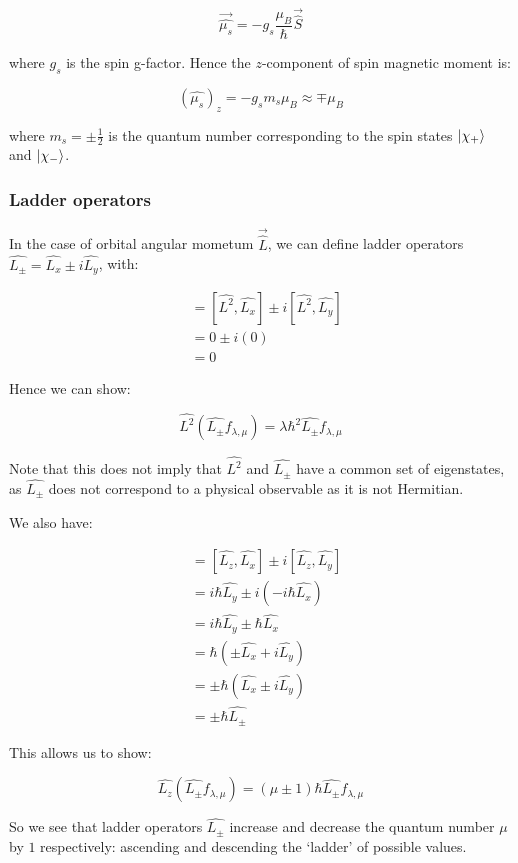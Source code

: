 \[ \vec{\hat{\mu_s}} = -g_s \frac{\mu_B}{\hbar} \vec{\hat{S}} \]

where $g_s$ is the spin g-factor. Hence the $z$-component of spin magnetic moment is:

\[ (\hat{\mu_s})_z = -g_s m_s \mu_B  \approx \mp \mu_B \]

where $m_s = \pm\frac{1}{2}$ is the quantum number corresponding to the spin states $\ket{\chi_+}$ and $\ket{\chi_-}$.

\subsubsection{Ladder operators}

In the case of orbital angular mometum $\vec{\hat{L}}$, we can define ladder operators $\hat{L_\pm} = \hat{L_x} \pm i\hat{L_y}$, with:

\begin{align*} 
[\hat{L^2}, \hat{L_\pm}] &= [\hat{L^2}, \hat{L_x}] \pm i[\hat{L^2}, \hat{L_y}] \\
&= 0 \pm i (0) \\
&= 0 
\end{align*}

Hence we can show:

\[ \hat{L^2}(\hat{L_\pm}f_{\lambda, \mu}) = \lambda \hbar^2 \hat{L_\pm} f_{\lambda, \mu} \]

Note that this does not imply that $\hat{L^2}$ and $\hat{L_\pm}$ have a common set of eigenstates, as $\hat{L_\pm}$ does not correspond to a physical observable as it is not Hermitian. 

We also have:

\begin{align*}
[\hat{L_z}, \hat{L_\pm}] &= [\hat{L_z}, \hat{L_x}] \pm i[\hat{L_z}, \hat{L_y}] \\
&= i\hbar\hat{L_y} \pm i(-i\hbar\hat{L_x}) \\
&= i\hbar\hat{L_y} \pm \hbar\hat{L_x} \\
&= \hbar (\pm\hat{L_x} + i\hat{L_y}) \\
&= \pm\hbar(\hat{L_x} \pm i\hat{L_y}) \\
&= \pm\hbar\hat{L_\pm}
\end{align*}

This allows us to show:

\[ \hat{L_z}(\hat{L_\pm}f_{\lambda, \mu}) = (\mu \pm 1)\hbar \hat{L_\pm} f_{\lambda, \mu} \]

So we see that ladder operators $\hat{L_\pm}$ increase and decrease the quantum number $\mu$ by $1$ respectively: ascending and descending the `ladder' of possible values.

